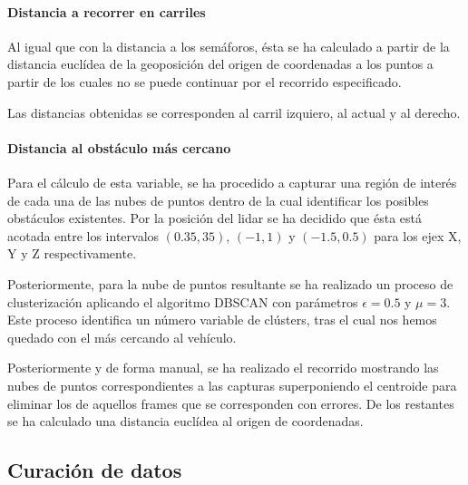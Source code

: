 \paragraph{Distancia a recorrer en carriles}

Al igual que con la distancia a los semáforos, ésta se ha calculado a partir de la distancia euclídea de la geoposición del origen de coordenadas a los puntos a partir de los cuales no se puede continuar por el recorrido especificado.

Las distancias obtenidas se corresponden al carril izquiero, al actual y al derecho.

\paragraph{Distancia al obstáculo más cercano}

Para el cálculo de esta variable, se ha procedido a capturar una región de interés de cada una de las nubes de puntos dentro de la cual identificar los posibles obstáculos existentes. Por la posición del lidar se ha decidido que ésta está acotada entre los intervalos $(0.35, 35)$, $(-1, 1)$ y $(-1.5, 0.5)$ para los ejex X, Y y Z respectivamente.

Posteriormente, para la nube de puntos resultante se ha realizado un proceso de clusterización aplicando el algoritmo DBSCAN con parámetros $\epsilon = 0.5$ y $\mu = 3$. Este proceso identifica un número variable de clústers, tras el cual nos hemos quedado con el más cercando al vehículo.

Posteriormente y de forma manual, se ha realizado el recorrido mostrando las nubes de puntos correspondientes a las capturas superponiendo el centroide para eliminar los de aquellos frames que se corresponden con errores. De los restantes se ha calculado una distancia euclídea al origen de coordenadas.

\subsection{Curación de datos}

